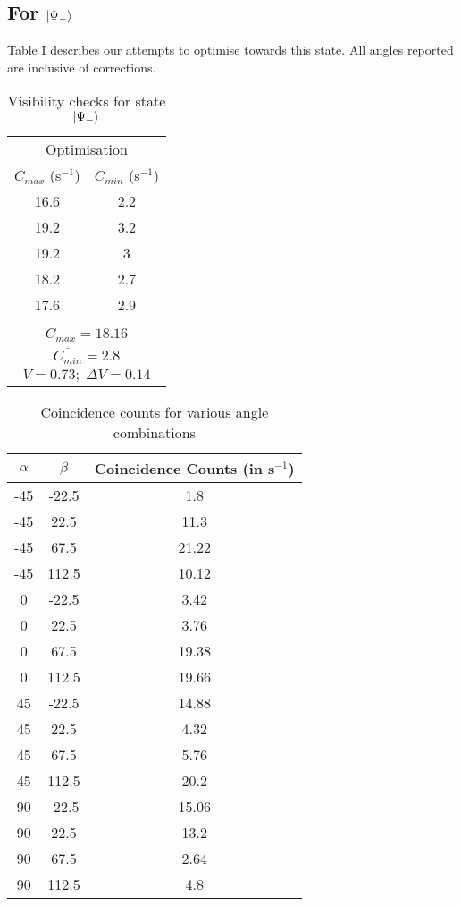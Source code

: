 \documentclass[aps,prl,nofootinbib,twocolumn,superscriptaddress,groupedaddress]{revtex4}  %
\begin{document}
\subsection*{For $\ket{\Psi_{-}}$}
Table I describes our attempts to optimise towards this state. All angles reported are inclusive of corrections. 
\begin{table}[H]
\centering
\begin{tabular}{|c|c|}
\hline
\multicolumn{2}{|c|}{Optimisation}\\
$C_{max}$ (s$^{-1}$) & $C_{min}$ (s$^{-1}$)\\
\hline
16.6 & 2.2 \\
19.2 & 3.2 \\
19.2 & 3 \\
18.2 & 2.7 \\
17.6 & 2.9 \\
\hline
\multicolumn{2}{|c|}{}\\[-2mm]
\multicolumn{2}{|c|}{$\overline{C_{max}} = 18.16$}\\
\multicolumn{2}{|c|}{$\overline{C_{min}} = 2.8$}\\
\multicolumn{2}{|c|}{$V = 0.73;\; \Delta V = 0.14$}\\
\hline
\end{tabular}
\caption{Visibility checks for state $\ket{\Psi_{-}}$}
\end{table}
\begin{table}[H]
\centering
\begin{tabular}{|c|c|c|}
\hline
$\alpha$ & $\beta$ & Coincidence Counts (in s$^{-1}$)\\
\hline
-45 & -22.5 & 1.8\\
-45 & 22.5 & 11.3\\
-45 & 67.5 & 21.22\\
-45 & 112.5 & 10.12\\
\hline
0 & -22.5 & 3.42\\
0 & 22.5 & 3.76\\
0 & 67.5 & 19.38\\
0 & 112.5 & 19.66\\
\hline
45 & -22.5 & 14.88\\
45 & 22.5 & 4.32\\
45 & 67.5 & 5.76\\
45 & 112.5 & 20.2\\
\hline
90 & -22.5 & 15.06\\
90 & 22.5 & 13.2\\
90 & 67.5 & 2.64\\
90 & 112.5 & 4.8\\
\hline
\end{tabular}
\caption{Coincidence counts for various angle combinations}
\end{table}
\end{document}
